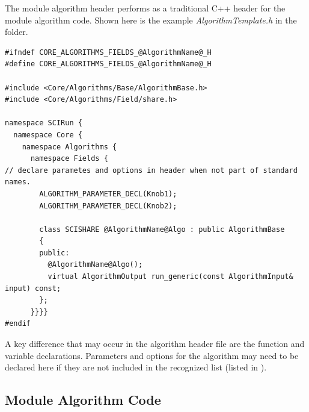 \documentclass[fleqn,11pt,openany]{book}
\begin{document}
The module algorithm header performs as a traditional C++ header for the module algorithm code.  
Shown here is the example \emph{AlgorithmTemplate.h} in the \emph{} folder.
\begin{verbatim}
#ifndef CORE_ALGORITHMS_FIELDS_@AlgorithmName@_H
#define CORE_ALGORITHMS_FIELDS_@AlgorithmName@_H

#include <Core/Algorithms/Base/AlgorithmBase.h>
#include <Core/Algorithms/Field/share.h>

namespace SCIRun {
  namespace Core {
    namespace Algorithms {
      namespace Fields {
// declare parametes and options in header when not part of standard names. 
        ALGORITHM_PARAMETER_DECL(Knob1);
        ALGORITHM_PARAMETER_DECL(Knob2);

        class SCISHARE @AlgorithmName@Algo : public AlgorithmBase
        {
        public:
          @AlgorithmName@Algo();
          virtual AlgorithmOutput run_generic(const AlgorithmInput& input) const; 
        };
      }}}}
#endif 
\end{verbatim}
A key difference that may occur in the algorithm header file are the function and variable declarations.
Parameters and options for the algorithm may need to be declared here if they are not included in the recognized list (listed in \emph{}).

\subsection{Module Algorithm Code}
\end{document}
